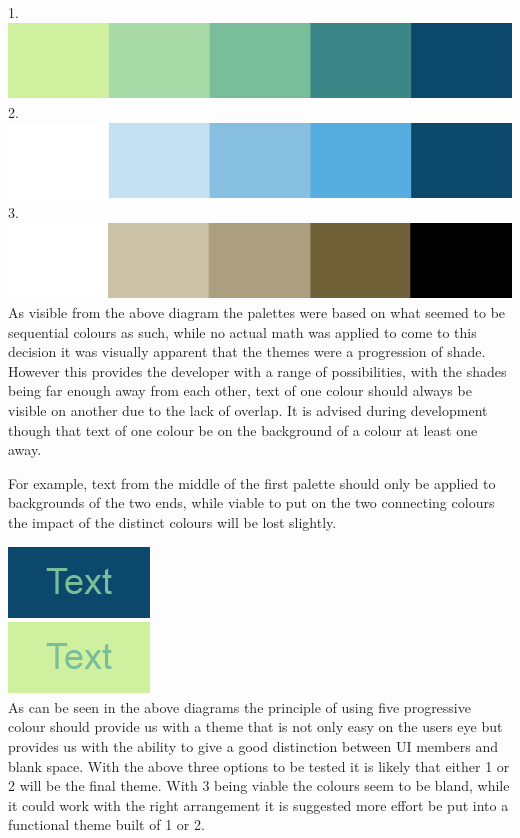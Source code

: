 1.
\includegraphics[scale=0.5]{Chapter2/colourone.png} \\

2.
\includegraphics[scale=0.5]{Chapter2/colourtwo.png} \\

3.
\includegraphics[scale=0.5]{Chapter2/colourthree.png} \\

As visible from the above diagram the palettes were based on what seemed to be sequential colours as such, while no actual math was applied to come to this decision it was visually apparent that the themes were a progression of shade. However this provides the developer with a range of possibilities, with the shades being far enough away from each other, text of one colour should always be visible on another due to the lack of overlap. It is advised during development though that text of one colour be on the background of a colour at least one away. 

For example, text from the middle of the first palette should only be applied to backgrounds of the two ends, while viable to put on the two connecting colours the impact of the distinct colours will be lost slightly. 

\includegraphics[scale=0.5]{Chapter2/textone.png} \\

\vspace{0.2cm}
\includegraphics[scale=0.5]{Chapter2/texttwo.png} \\
\newpage
As can be seen in the above diagrams the principle of using five progressive colour should provide us with a theme that is not only easy on the users eye but provides us with the ability to give a good distinction between UI members and blank space. With the above three options to be tested it is likely that either 1 or 2 will be the final theme. With 3 being viable the colours seem to be bland, while it could work with the right arrangement it is suggested more effort be put into a functional theme built of 1 or 2. 

